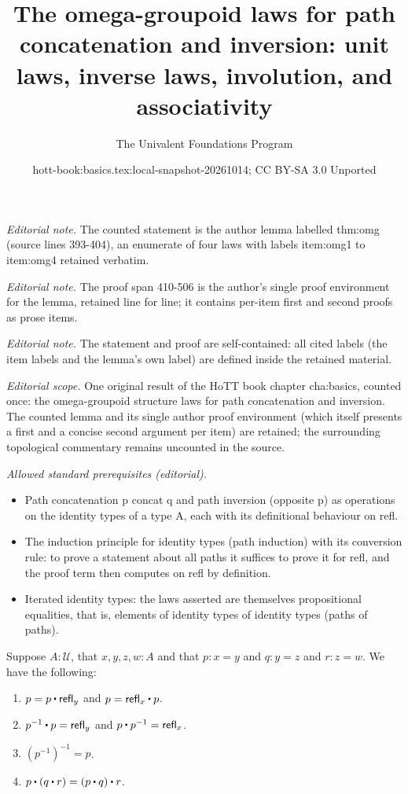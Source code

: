 \documentclass[10pt,a4paper]{article}
\title{The omega-groupoid laws for path concatenation and inversion: unit laws, inverse laws, involution, and associativity}
\author{The Univalent Foundations Program}
\date{hott-book:basics.tex:local-snapshot-20261014; CC BY-SA 3.0 Unported}
\newcounter{chapter}
\providecommand{\index}[1]{}
\newcommand{\refl}[1]{\ensuremath{\mathsf{refl}_{#1}}\xspace}
\newcommand{\ct}{%
  \mathchoice{\mathbin{\raisebox{0.5ex}{$\displaystyle\centerdot$}}}%
             {\mathbin{\raisebox{0.5ex}{$\centerdot$}}}%
             {\mathbin{\raisebox{0.25ex}{$\scriptstyle\,\centerdot\,$}}}%
             {\mathbin{\raisebox{0.1ex}{$\scriptscriptstyle\,\centerdot\,$}}}
}
\newcommand{\opp}[1]{\mathord{{#1}^{-1}}}
\newcommand{\UU}{\ensuremath{\mathcal{U}}\xspace}
\let\type\UU
\theoremstyle{definition}
\theoremstyle{remark}
\numberwithin{equation}{section}
\begin{document}
\maketitle
\noindent\textit{Editorial note.} The counted statement is the author lemma labelled thm:omg (source lines 393-404), an enumerate of four laws with labels item:omg1 to item:omg4 retained verbatim.\par\medskip
\noindent\textit{Editorial note.} The proof span 410-506 is the author's single proof environment for the lemma, retained line for line; it contains per-item first and second proofs as prose items.\par\medskip
\noindent\textit{Editorial note.} The statement and proof are self-contained: all cited labels (the item labels and the lemma's own label) are defined inside the retained material.\par\medskip
\noindent\textit{Editorial scope.} One original result of the HoTT book chapter cha:basics, counted once: the omega-groupoid structure laws for path concatenation and inversion. The counted lemma and its single author proof environment (which itself presents a first and a concise second argument per item) are retained; the surrounding topological commentary remains uncounted in the source.\par\medskip
\noindent\textit{Allowed standard prerequisites (editorial).}\begin{itemize}
\item Path concatenation p concat q and path inversion (opposite p) as operations on the identity types of a type A, each with its definitional behaviour on refl.
\item The induction principle for identity types (path induction) with its conversion rule: to prove a statement about all paths it suffices to prove it for refl, and the proof term then computes on refl by definition.
\item Iterated identity types: the laws asserted are themselves propositional equalities, that is, elements of identity types of identity types (paths of paths).
\end{itemize}\medskip
\begin{lem}\label{thm:omg}%
  \index{associativity!of path concatenation}%
  \index{unit!law for path concatenation}%
  Suppose $A:\type$, that $x,y,z,w:A$ and that $p:x= y$ and $q:y = z$ and $r:z=w$.
  We have the following:
  \begin{enumerate}
  \item $p= p\ct \refl{y}$ and $p = \refl{x} \ct p$.\label{item:omg1}
  \item $\opp{p}\ct p=  \refl{y}$ and $p\ct \opp{p}= \refl{x}$.\label{item:omg2}
  \item $\opp{(\opp{p})}= p$.\label{item:omg3}
  \item $p\ct (q\ct r)=  (p\ct q)\ct r$.\label{item:omg4}
  \end{enumerate}
\end{lem}
\end{document}
